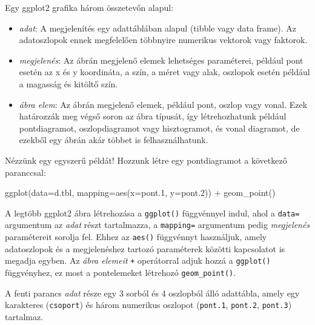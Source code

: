 \documentclass[
]{book}
\newenvironment{Shaded}{\begin{snugshade}}{\end{snugshade}}
\newcommand{\AttributeTok}[1]{\textcolor[rgb]{0.77,0.63,0.00}{#1}}
\newcommand{\FloatTok}[1]{\textcolor[rgb]{0.00,0.00,0.81}{#1}}
\newcommand{\FunctionTok}[1]{\textcolor[rgb]{0.00,0.00,0.00}{#1}}
\newcommand{\NormalTok}[1]{#1}
\newcommand{\SpecialCharTok}[1]{\textcolor[rgb]{0.00,0.00,0.00}{#1}}
\providecommand{\tightlist}{%
  \setlength{\itemsep}{0pt}\setlength{\parskip}{0pt}}
\begin{document}
Egy ggplot2 grafika három összetevőn alapul:

\begin{itemize}
\tightlist
\item
  \emph{adat}: A megjelenítés egy adattáblában alapul (tibble vagy data frame). Az adatoszlopok ennek megfelelően többnyire numerikus vektorok vagy faktorok.
\item
  \emph{megjelenés}: Az ábrán megjelenő elemek lehetséges paraméterei, például pont esetén az x és y koordináta, a szín, a méret vagy alak, oszlopok esetén például a magasság és kitöltő szín.
\item
  \emph{ábra elem}: Az ábrán megjelenő elemek, például pont, oszlop vagy vonal. Ezek határozzák meg végső soron az ábra típusát, így létrehozhatunk például pontdiagramot, oszlopdiagramot vagy hisztogramot, és vonal diagramot, de ezekből egy ábrán akár többet is felhasználhatunk.
\end{itemize}

Nézzünk egy egyszerű példát! Hozzunk létre egy pontdiagramot a következő paranccsal:

\begin{Shaded}
\begin{Highlighting}[]
\FunctionTok{ggplot}\NormalTok{(}\AttributeTok{data=}\NormalTok{d.tbl, }\AttributeTok{mapping=}\FunctionTok{aes}\NormalTok{(}\AttributeTok{x=}\NormalTok{pont}\FloatTok{.1}\NormalTok{, }\AttributeTok{y=}\NormalTok{pont}\FloatTok{.2}\NormalTok{)) }\SpecialCharTok{+} \FunctionTok{geom\_point}\NormalTok{()}
\end{Highlighting}
\end{Shaded}

A legtöbb ggplot2 ábra létrehozása a \texttt{ggplot()} függvénnyel indul, ahol a \texttt{data=} argumentum az \emph{adat} részt tartalmazza, a \texttt{mapping=} argumentum pedig \emph{megjelenés} paramétereit sorolja fel. Ehhez az \texttt{aes()} függvénnyt használjuk, amely adatoszlopok és a megjelenéshez tartozó paraméterek közötti kapcsolatot is megadja egyben. Az \emph{ábra elemeit} \texttt{+} operátorral adjuk hozzá a \texttt{ggplot()} függvényhez, ez most a pontelemeket létrehozó \texttt{geom\_point()}.

A fenti parancs \emph{adat} része egy 3 sorból és 4 oszlopból álló adattábla, amely egy karakteres (\texttt{csoport}) és három numerikus oszlopot (\texttt{pont.1}, \texttt{pont.2}, \texttt{pont.3}) tartalmaz.
\end{document}
